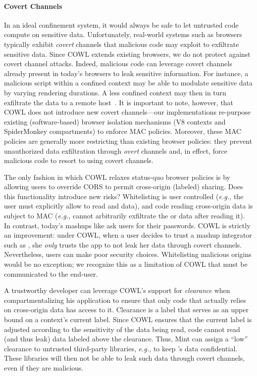 \paragraph{Covert Channels}
In an ideal confinement system, it would always be safe to let untrusted
code compute on sensitive data.
%
Unfortunately, real-world systems such as browsers typically exhibit
\emph{covert} channels that malicious code may exploit to exfiltrate
sensitive data.
%
Since COWL extends existing browsers, we do not protect against covert
channel attacks.
%
Indeed, malicious code can leverage covert channels already present in
today's browsers to leak sensitive information.
%
For instance, a malicious script within a confined context may be able
to modulate sensitive data by varying rendering durations. A less
confined context may then in turn exfiltrate the data to a remote
host~\cite{kotcher2013cross}.
%
It is important to note, however, that COWL does not introduce new
covert channels---our implementations re-purpose existing
(software-based) browser isolation mechanisms (V8 contexts and
SpiderMonkey compartments) to enforce MAC policies.
%
Moreover, these MAC policies are generally more restricting than
existing browser policies: they prevent unauthorized data exfiltration
through \emph{overt} channels and, in effect, force malicious code to
resort to using covert channels.


The only fashion in which COWL relaxes status-quo browser policies is
by allowing users to override CORS to permit cross-origin (labeled)
sharing.
%
Does this functionality introduce new risks?
%
Whitelisting is user controlled (\emph{e.g.,} the user must explicitly
allow  to read  and
 data), and code reading cross-origin data is subject
to MAC (\emph{e.g.,}  cannot arbitrarily exfiltrate
the  or  data after reading it).
%
In contrast, today's mashups like  ask users for their
passwords.
%
COWL is strictly an improvement: under
COWL, when a user decides to trust a mashup integrator such as
, she {\em only} trusts the app to not leak her data
through covert channels.
%
Nevertheless, users can make poor security choices. Whitelisting
malicious origins would be no exception; we recognize this as a
limitation of COWL that must be communicated to the
end-user.%

A trustworthy developer can leverage COWL's support for
\emph{clearance} when compartmentalizing his application to ensure
that only code that actually relies on cross-origin data has access to
it.
%
Clearance is a label that serves as an upper bound on a context's
current label. Since COWL ensures that the current label is adjusted
according to the sensitivity of the data being read, code cannot read
(and thus leak) data labeled above the clearance.
%
Thus, Mint can assign a ``low'' clearance to untrusted third-party
libraries, {\em e.g.,} to keep 's data confidential.
%
These libraries will then not be able to leak such data through covert
channels, even if they are malicious.

